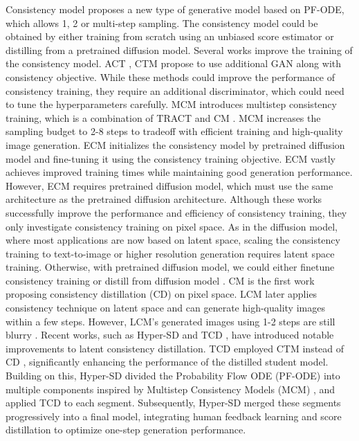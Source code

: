 Consistency model \citep{song2023consistency, song2023improved} proposes a new type of generative model based on PF-ODE, which allows 1, 2 or multi-step sampling. The consistency model could be obtained by either training from scratch using an unbiased score estimator or distilling from a pretrained diffusion model. Several works improve the training of the consistency model. ACT \citep{kong2023act}, CTM \citep{kim2023consistency} propose to use additional GAN along with consistency objective. While these methods could improve the performance of consistency training, they require an additional discriminator, which could need to tune the hyperparameters carefully. MCM \citep{heek2024multistep} introduces multistep consistency training, which is a combination of TRACT \citep{berthelot2023tract} and CM \citep{song2023consistency}. MCM increases the sampling budget to 2-8 steps to tradeoff with efficient training and high-quality image generation. ECM \citep{geng2024consistency} initializes the consistency model by pretrained diffusion model and fine-tuning it using the consistency training objective. ECM vastly achieves improved training times while maintaining good generation performance. However, ECM requires pretrained diffusion model, which must use the same architecture as the pretrained diffusion architecture. Although these works successfully improve the performance and efficiency of consistency training, they only investigate consistency training on pixel space. As in the diffusion model, where most applications are now based on latent space, scaling the consistency training \citep{song2023consistency, song2023improved} to text-to-image or higher resolution generation requires latent space training. Otherwise, with pretrained diffusion model, we could either finetune consistency training \citep{geng2024consistency} or distill from diffusion model \citep{song2023consistency, luo2023latent}. CM \citep{song2023consistency} is the first work proposing consistency distillation (CD) on pixel space. LCM \citep{luo2023latent} later applies consistency technique on latent space and can generate high-quality images within a few steps. However, LCM's generated images using 1-2 steps are still blurry \citep{luo2023latent}. Recent works, such as Hyper-SD \cite{ren2024hyper} and TCD \cite{zheng2024trajectory}, have introduced notable improvements to latent consistency distillation. TCD \cite{zheng2024trajectory} employed CTM \cite{kim2023consistency} instead of CD \cite{song2023consistency}, significantly enhancing the performance of the distilled student model. Building on this, Hyper-SD \cite{ren2024hyper} divided the Probability Flow ODE (PF-ODE) into multiple components inspired by Multistep Consistency Models (MCM) \cite{heek2024multistep}, and applied TCD \cite{zheng2024trajectory} to each segment. Subsequently, Hyper-SD \cite{ren2024hyper} merged these segments progressively into a final model, integrating human feedback learning and score distillation \cite{yin2024one} to optimize one-step generation performance.